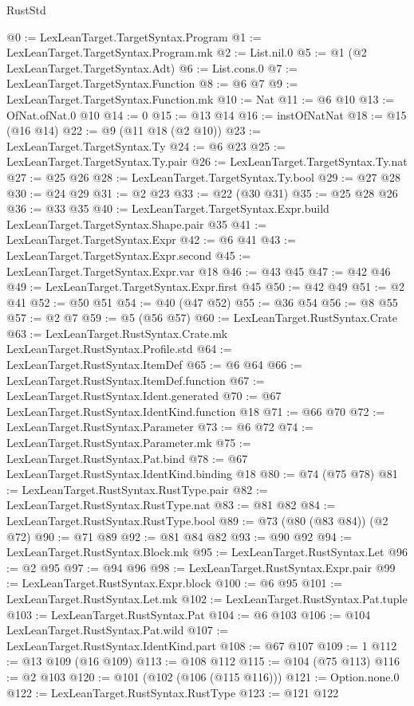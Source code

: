 \begin{lexlean}{RustStd}
\begin{coremodule}
@0 := LexLeanTarget.TargetSyntax.Program
@1 := LexLeanTarget.TargetSyntax.Program.mk
@2 := List.nil.{0}
@5 := @1 (@2 LexLeanTarget.TargetSyntax.Adt)
@6 := List.cons.{0}
@7 := LexLeanTarget.TargetSyntax.Function
@8 := @6 @7
@9 := LexLeanTarget.TargetSyntax.Function.mk
@10 := Nat
@11 := @6 @10
@13 := OfNat.ofNat.{0} @10
@14 := 0
@15 := @13 @14
@16 := instOfNatNat
@18 := @15 (@16 @14)
@22 := @9 (@11 @18 (@2 @10))
@23 := LexLeanTarget.TargetSyntax.Ty
@24 := @6 @23
@25 := LexLeanTarget.TargetSyntax.Ty.pair
@26 := LexLeanTarget.TargetSyntax.Ty.nat
@27 := @25 @26
@28 := LexLeanTarget.TargetSyntax.Ty.bool
@29 := @27 @28
@30 := @24 @29
@31 := @2 @23
@33 := @22 (@30 @31)
@35 := @25 @28 @26
@36 := @33 @35
@40 := LexLeanTarget.TargetSyntax.Expr.build LexLeanTarget.TargetSyntax.Shape.pair @35
@41 := LexLeanTarget.TargetSyntax.Expr
@42 := @6 @41
@43 := LexLeanTarget.TargetSyntax.Expr.second
@45 := LexLeanTarget.TargetSyntax.Expr.var @18
@46 := @43 @45
@47 := @42 @46
@49 := LexLeanTarget.TargetSyntax.Expr.first @45
@50 := @42 @49
@51 := @2 @41
@52 := @50 @51
@54 := @40 (@47 @52)
@55 := @36 @54
@56 := @8 @55
@57 := @2 @7
@59 := @5 (@56 @57)
@60 := LexLeanTarget.RustSyntax.Crate
@63 := LexLeanTarget.RustSyntax.Crate.mk LexLeanTarget.RustSyntax.Profile.std
@64 := LexLeanTarget.RustSyntax.ItemDef
@65 := @6 @64
@66 := LexLeanTarget.RustSyntax.ItemDef.function
@67 := LexLeanTarget.RustSyntax.Ident.generated
@70 := @67 LexLeanTarget.RustSyntax.IdentKind.function @18
@71 := @66 @70
@72 := LexLeanTarget.RustSyntax.Parameter
@73 := @6 @72
@74 := LexLeanTarget.RustSyntax.Parameter.mk
@75 := LexLeanTarget.RustSyntax.Pat.bind
@78 := @67 LexLeanTarget.RustSyntax.IdentKind.binding @18
@80 := @74 (@75 @78)
@81 := LexLeanTarget.RustSyntax.RustType.pair
@82 := LexLeanTarget.RustSyntax.RustType.nat
@83 := @81 @82
@84 := LexLeanTarget.RustSyntax.RustType.bool
@89 := @73 (@80 (@83 @84)) (@2 @72)
@90 := @71 @89
@92 := @81 @84 @82
@93 := @90 @92
@94 := LexLeanTarget.RustSyntax.Block.mk
@95 := LexLeanTarget.RustSyntax.Let
@96 := @2 @95
@97 := @94 @96
@98 := LexLeanTarget.RustSyntax.Expr.pair
@99 := LexLeanTarget.RustSyntax.Expr.block
@100 := @6 @95
@101 := LexLeanTarget.RustSyntax.Let.mk
@102 := LexLeanTarget.RustSyntax.Pat.tuple
@103 := LexLeanTarget.RustSyntax.Pat
@104 := @6 @103
@106 := @104 LexLeanTarget.RustSyntax.Pat.wild
@107 := LexLeanTarget.RustSyntax.IdentKind.part
@108 := @67 @107
@109 := 1
@112 := @13 @109 (@16 @109)
@113 := @108 @112
@115 := @104 (@75 @113)
@116 := @2 @103
@120 := @101 (@102 (@106 (@115 @116)))
@121 := Option.none.{0}
@122 := LexLeanTarget.RustSyntax.RustType
@123 := @121 @122

\end{coremodule}
\end{lexlean}
